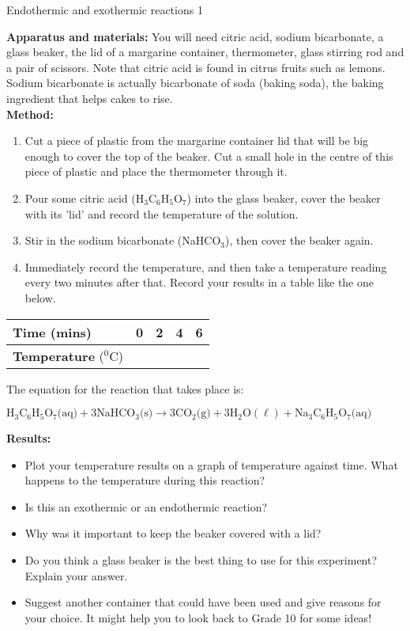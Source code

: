 \begin{g_experiment}{Endothermic and exothermic reactions 1}{
\textbf{Apparatus and materials: } You will need citric acid, sodium bicarbonate, a glass beaker, the lid of a margarine container, thermometer, glass stirring rod and a pair of scissors. Note that citric acid is found in citrus fruits such as lemons. Sodium bicarbonate is actually bicarbonate of soda (baking soda), the baking ingredient that helps cakes to rise.\\
\textbf{Method: }
\begin{enumerate}
\item{Cut a piece of plastic from the margarine container lid that will be big enough to cover the top of the beaker. Cut a small hole in the centre of this piece of plastic and place the thermometer through it.}
\item{Pour some citric acid (H$_{3}$C$_{6}$H$_{5}$O$_{7}$) into the glass beaker, cover the beaker with its 'lid' and record the temperature of the solution.}
\item{Stir in the sodium bicarbonate (NaHCO$_{3}$), then cover the beaker again.}
\item{Immediately record the temperature, and then take a temperature reading every two minutes after that. Record your results in a table like the one below.}
\end{enumerate}
\begin{center}
\begin{tabular}{|l|c|c|c|c|}\hline
\textbf{Time} (mins) & 0 & 2 & 4 & 6 \\\hline
\textbf{Temperature} ($^{0}$C) & & & &  \\\hline
\end{tabular}
\end{center}

The equation for the reaction that takes place is:

\begin{center}
$\text{H}_{3}\text{C}_{6}\text{H}_{5}\text{O}_{7}\text{(aq)} + 3\text{NaHCO}_{3}\text{(s)} \rightarrow 3\text{CO}_{2}\text{(g)} + 3\text{H}_{2}\text{O}(\ell) + \text{Na}_{3}\text{C}_{6}\text{H}_{5}\text{O}_{7}\text{(aq)}$
\end{center}

\textbf{Results: }
\begin{itemize}
\item{Plot your temperature results on a graph of temperature against time. What happens to the temperature during this reaction?}
\item{Is this an exothermic or an endothermic reaction?}
\item{Why was it important to keep the beaker covered with a lid?}
\item{Do you think a glass beaker is the best thing to use for this experiment? Explain your answer.}
\item{Suggest another container that could have been used and give reasons for your choice. It might help you to look back to Grade 10 for some ideas!}
\end{itemize}
}
\end{g_experiment}
